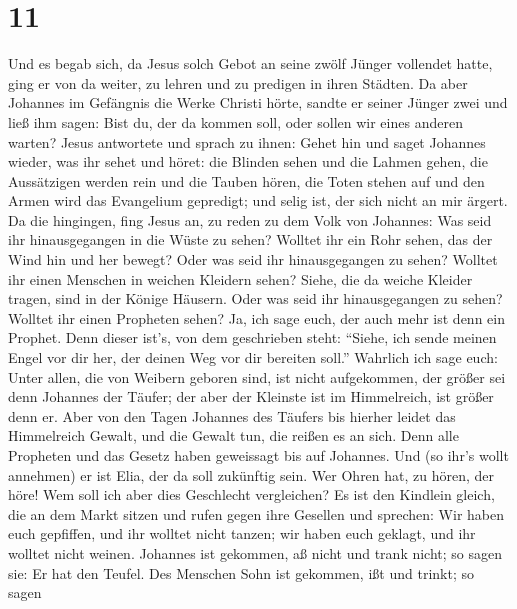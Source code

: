 \hypertarget{section-10}{%
\section{11}\label{section-10}}

 Und es begab sich, da Jesus solch Gebot an seine zwölf
Jünger vollendet hatte, ging er von da weiter, zu lehren und zu predigen
in ihren Städten.  Da aber Johannes im Gefängnis die Werke
Christi hörte, sandte er seiner Jünger zwei  und ließ ihm
sagen: Bist du, der da kommen soll, oder sollen wir eines anderen
warten?  Jesus antwortete und sprach zu ihnen: Gehet hin und
saget Johannes wieder, was ihr sehet und höret:  die Blinden
sehen und die Lahmen gehen, die Aussätzigen werden rein und die Tauben
hören, die Toten stehen auf und den Armen wird das Evangelium gepredigt;
 und selig ist, der sich nicht an mir ärgert. 
Da die hingingen, fing Jesus an, zu reden zu dem Volk von Johannes: Was
seid ihr hinausgegangen in die Wüste zu sehen? Wolltet ihr ein Rohr
sehen, das der Wind hin und her bewegt?  Oder was seid ihr
hinausgegangen zu sehen? Wolltet ihr einen Menschen in weichen Kleidern
sehen? Siehe, die da weiche Kleider tragen, sind in der Könige Häusern.
 Oder was seid ihr hinausgegangen zu sehen? Wolltet ihr
einen Propheten sehen? Ja, ich sage euch, der auch mehr ist denn ein
Prophet.  Denn dieser ist's, von dem geschrieben steht:
``Siehe, ich sende meinen Engel vor dir her, der deinen Weg vor dir
bereiten soll.''  Wahrlich ich sage euch: Unter allen, die
von Weibern geboren sind, ist nicht aufgekommen, der größer sei denn
Johannes der Täufer; der aber der Kleinste ist im Himmelreich, ist
größer denn er.  Aber von den Tagen Johannes des Täufers
bis hierher leidet das Himmelreich Gewalt, und die Gewalt tun, die
reißen es an sich.  Denn alle Propheten und das Gesetz
haben geweissagt bis auf Johannes.  Und (so ihr's wollt
annehmen) er ist Elia, der da soll zukünftig sein.  Wer
Ohren hat, zu hören, der höre!  Wem soll ich aber dies
Geschlecht vergleichen? Es ist den Kindlein gleich, die an dem Markt
sitzen und rufen gegen ihre Gesellen  und sprechen: Wir
haben euch gepfiffen, und ihr wolltet nicht tanzen; wir haben euch
geklagt, und ihr wolltet nicht weinen.  Johannes ist
gekommen, aß nicht und trank nicht; so sagen sie: Er hat den Teufel.
 Des Menschen Sohn ist gekommen, ißt und trinkt; so sagen
